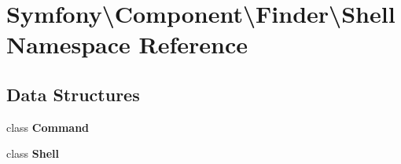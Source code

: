 \section{Symfony\textbackslash{}Component\textbackslash{}Finder\textbackslash{}Shell Namespace Reference}
\label{namespace_symfony_1_1_component_1_1_finder_1_1_shell}
\subsection*{Data Structures}
\begin{DoxyCompactItemize}
\item 
class {\bf Command}
\item 
class {\bf Shell}
\end{DoxyCompactItemize}

